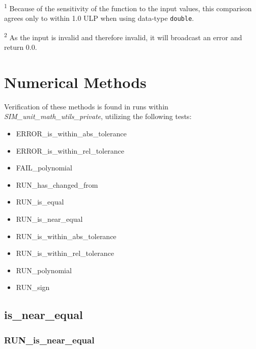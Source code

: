 \documentclass[11pt,fleqn]{report}
\begin{document}
\textsuperscript{1} Because of the sensitivity of the function to the input
values, this comparison agrees only to within 1.0 ULP when using data-type
\texttt{double}.

\textsuperscript{2} As the input is invalid and therefore invalid, it will broadcast 
an error and return 0.0.

\section{Numerical Methods}
Verification of these methods is found in runs within
\textit{SIM\_unit\_math\_utils\_private}, utilizing the following tests:
\begin{itemize}
 \item ERROR\_is\_within\_abs\_tolerance
 \item ERROR\_is\_within\_rel\_tolerance
 \item FAIL\_polynomial
 \item RUN\_has\_changed\_from
 \item RUN\_is\_equal
 \item RUN\_is\_near\_equal
 \item RUN\_is\_within\_abs\_tolerance
 \item RUN\_is\_within\_rel\_tolerance
 \item RUN\_polynomial
 \item RUN\_sign
\end{itemize}

\subsection{is\_near\_equal}
\subsubsection{RUN\_is\_near\_equal}
\end{document}
